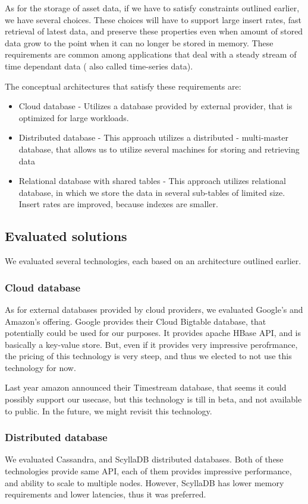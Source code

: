 As for the storage of asset data, if we have to satisfy constraints outlined earlier, we have several choices. These
choices will have to support large insert rates, fast retrieval of latest data, and preserve these properties even
when amount of stored data grow to the point when it can no longer be stored in memory. These requirements are common
among applications that deal with a steady stream of time dependant data ( also called time-series data).

The conceptual architectures that satisfy these requirements are:
\begin{itemize}
    \item{Cloud database} - Utilizes a database provided by external provider, that is optimized
    for large workloads.
    \item{Distributed database} - This approach utilizes a distributed - multi-master database,
    that allows us to utilize several machines for storing and retrieving data

    \item{Relational database with shared tables} - This approach utilizes relational database, in which
    we store the data in several sub-tables of limited size. Insert rates are improved, because indexes
    are smaller.
\end{itemize}

\subsection{Evaluated solutions}
We evaluated several technologies, each based on an architecture outlined earlier.
\subsubsection{Cloud database}
As for external databases provided by cloud providers, we evaluated Google's and Amazon's offering.
Google provides their Cloud Bigtable database, that potentially could be used for our purposes. It provides
apache HBase API, and is basically a key-value store. But, even if it provides very impressive perofrmance,
the pricing of this technology is very steep, and thus we elected to not use this technology for now.

Last year amazon announced their Timestream database, that seems it could possibly support our usecase, but this
technology is till in beta, and not available to public. In the future, we might revisit this technology.

\subsubsection{Distributed database}
We evaluated Cassandra, and ScyllaDB distributed databases. Both of these technologies
provide same API, each of them provides impressive performance, and ability to scale to multiple nodes.
However, ScyllaDB has lower memory requirements and lower latencies, thus it was preferred.

